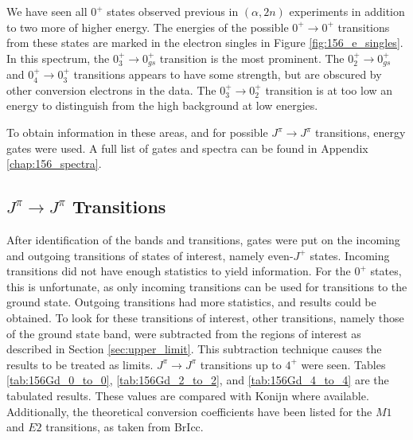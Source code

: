 We have seen all $0^+$ states observed previous in $(\alpha,2n)$ experiments in addition to two more of higher energy. The energies of the possible $0^+\rightarrow 0^+$ transitions from these states are marked in the electron singles in Figure \ref{fig:156_e_singles}. In this spectrum, the $0^+_{3}\rightarrow 0^+_{gs}$ transition is the most prominent. The $0^+_{2}\rightarrow 0^+_{gs}$ and $0^+_{4}\rightarrow 0^+_{3}$ transitions appears to have some strength, but are obscured by other conversion electrons in the data. The $0^+_{3}\rightarrow 0^+_{2}$ transition is at too low an energy to distinguish from the high background at low energies.



To obtain information in these areas, and for possible $J^{\pi}\rightarrow J^{\pi}$ transitions, energy gates were used. A full list of gates and spectra can be found in Appendix \ref{chap:156_spectra}.

\subsection{$J^{\pi}\rightarrow J^{\pi}$ Transitions}

After identification of the bands and transitions, gates were put on the incoming and outgoing transitions of states of interest, namely even-$J^+$ states. Incoming transitions did not have enough statistics to yield information. For the $0^+$ states, this is unfortunate, as only incoming transitions can be used for transitions to the ground state. Outgoing transitions had more statistics, and results could be obtained.  To look for these transitions of interest, other transitions, namely those of the ground state band, were subtracted from the regions of interest as described in Section \ref{sec:upper_limit}. This subtraction technique causes the results to be treated as limits.  $J^\pi\rightarrow J^\pi$ transitions up to $4^+$ were seen. Tables \ref{tab:156Gd_0_to_0}, \ref{tab:156Gd_2_to_2}, and \ref{tab:156Gd_4_to_4} are the tabulated results. These values are compared with Konijn\citep{konijn81:_156gd} where available. Additionally, the theoretical conversion coefficients have been listed for the $M1$ and $E2$ transitions, as taken from BrIcc\citep{kibedi08:_BRICC}.
    
\afterpage{\clearpage}

\afterpage{\clearpage}

